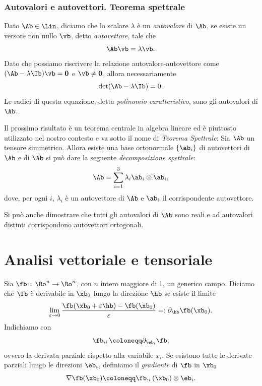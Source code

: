 \subsubsection{Autovalori e autovettori. Teorema spettrale}
Dato $\Ab\in\Lin$, diciamo che lo scalare $\lambda$ è un \textit{autovalore} di $\Ab$, se esiste un versore non nullo $\vb$, detto \textit{autovettore}, tale che
\begin{equation}
	\Ab \vb =\lambda \vb.
\end{equation}
Dato che possiamo riscrivere la relazione autovalore-autovettore come $(\Ab -\lambda\Ib)\vb =\mathbf{0}$ e $\vb \neq \mathbf{0}$, allora necessariamente 
\begin{equation}
	\det (\Ab -\lambda \Ib)=0.
\end{equation}
Le radici di questa equazione, detta \textit{polinomio caratteristico}, sono gli autovalori di $\Ab$.

Il prossimo risultato è un teorema centrale in algebra lineare ed è piuttosto utilizzato nel nostro contesto e va sotto il nome di \textit{Teorema Spettrale}:
Sia $\Ab$ un tensore simmetrico. Allora esiste una base ortonormale $\{\ab_i\}$ di autovettori di $\Ab$ e di $\Ab$ si può dare la seguente \textit{decomposizione spettrale}:
\begin{equation}
	\Ab=\sum_{i=1}^3 \lambda_i \ab_i\otimes\ab_i,
\end{equation}
dove, per ogni $i$, $\lambda_i$ è un autovettore di $\Ab$ e $\ab_i$ il corrispondente autovettore.

Si può anche dimostrare che tutti gli autovalori di $\Ab$ sono reali e ad autovalori distinti corrispondono autovettori ortogonali.

\section{Analisi vettoriale e tensoriale}
Sia $\fb \, :\, \Ro^n\to \Ro ^n$, con $n$ intero maggiore di 1, un generico campo. Diciamo che $\fb$ è derivabile in $\xb_0$ lungo la direzione $\hb$ se esiste il limite
\begin{equation}
	\lim_{\varepsilon\to 0} \frac{\fb (\xb_0+\varepsilon\hb)-\fb(\xb_0)}{\varepsilon}=: \partial_\hb \fb (\xb_0).
\end{equation} 
Indichiamo con 
\begin{equation}
	\fb,_i\coloneqq \partial_{\eb_i}\fb,
	\end{equation}
ovvero la derivata parziale rispetto alla variabile $x_i$. Se esistono tutte le derivate parziali lungo le direzioni $\eb_i$, definiamo il \textit{gradiente} di $\fb$ in $\xb_0$
\begin{equation}
	\nabla \fb (\xb_0)\coloneqq \fb,_i(\xb_0)\otimes \eb_i.
\end{equation}

